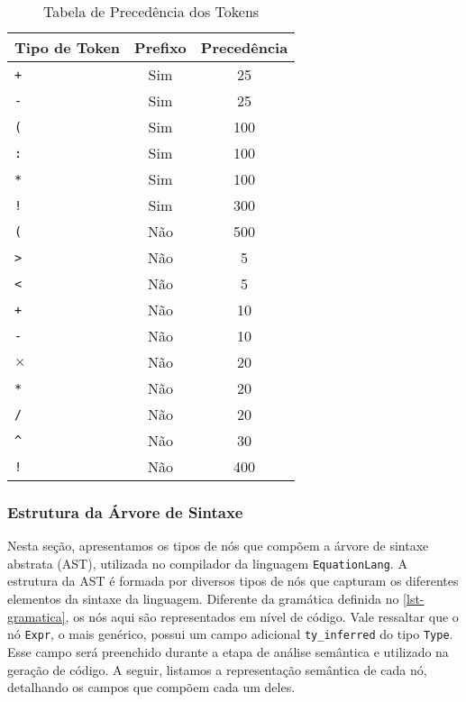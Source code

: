 \begin{table}[h!]
\centering
\begin{tabular}{|l|c|c|}
\hline
\textbf{Tipo de Token} & \textbf{Prefixo} & \textbf{Precedência}\\ \hline
\texttt{+}            & Sim              & 25                   \\ \hline
\texttt{-}            & Sim              & 25                   \\ \hline
\texttt{(}            & Sim              & 100                  \\ \hline
\texttt{:}            & Sim              & 100                  \\ \hline
\texttt{*}            & Sim              & 100                  \\ \hline
\texttt{!}            & Sim              & 300                  \\ \hline
\texttt{(}            & Não              & 500                  \\ \hline
\texttt{>}            & Não              & 5                    \\ \hline
\texttt{<}            & Não              & 5                    \\ \hline
\texttt{+}            & Não              & 10                   \\ \hline
\texttt{-}            & Não              & 10                   \\ \hline
$\times$              & Não              & 20                   \\ \hline
\texttt{*}            & Não              & 20                   \\ \hline
\texttt{/}            & Não              & 20                   \\ \hline
\texttt{\textasciicircum} & Não           & 30                  \\ \hline
\texttt{!}            & Não              & 400                  \\ \hline
\end{tabular}
\caption{Tabela de Precedência dos Tokens}
\label{tab-token-precedence}
\end{table}


\subsubsection{Estrutura da Árvore de Sintaxe}
Nesta seção, apresentamos os tipos de nós que compõem a árvore de sintaxe abstrata (AST), utilizada no compilador da linguagem \texttt{EquationLang}. A estrutura da AST é formada por diversos tipos de nós que capturam os diferentes elementos da sintaxe da linguagem. Diferente da gramática definida no \autoref{lst-gramatica}, os nós aqui são representados em nível de código. Vale ressaltar que o nó \texttt{Expr}, o mais genérico, possui um campo adicional \texttt{ty\_inferred} do tipo \texttt{Type}. Esse campo será preenchido durante a etapa de análise semântica e utilizado na geração de código. A seguir, listamos a representação semântica de cada nó, detalhando os campos que compõem cada um deles.


